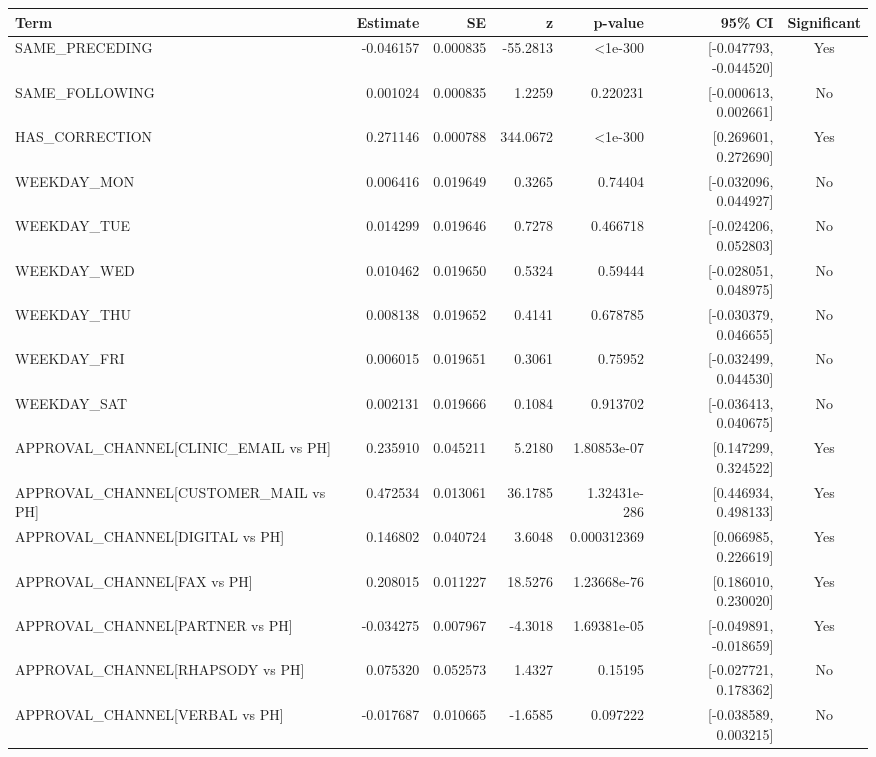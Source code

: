 \documentclass[
]{article}
\newcounter{none} %
\begin{document}
{\def\LTcaptype{none} %
\begin{longtable}[]{@{}lrrrrrc@{}}
\toprule\noalign{}
Term & Estimate & SE & z & p-value & 95\% CI & Significant \\
\midrule\noalign{}
\endhead
\bottomrule\noalign{}
\endlastfoot
SAME\_PRECEDING & -0.046157 & 0.000835 & -55.2813 & \textless1e-300 &
{[}-0.047793, -0.044520{]} & Yes \\
SAME\_FOLLOWING & 0.001024 & 0.000835 & 1.2259 & 0.220231 &
{[}-0.000613, 0.002661{]} & No \\
HAS\_CORRECTION & 0.271146 & 0.000788 & 344.0672 & \textless1e-300 &
{[}0.269601, 0.272690{]} & Yes \\
WEEKDAY\_MON & 0.006416 & 0.019649 & 0.3265 & 0.74404 & {[}-0.032096,
0.044927{]} & No \\
WEEKDAY\_TUE & 0.014299 & 0.019646 & 0.7278 & 0.466718 & {[}-0.024206,
0.052803{]} & No \\
WEEKDAY\_WED & 0.010462 & 0.019650 & 0.5324 & 0.59444 & {[}-0.028051,
0.048975{]} & No \\
WEEKDAY\_THU & 0.008138 & 0.019652 & 0.4141 & 0.678785 & {[}-0.030379,
0.046655{]} & No \\
WEEKDAY\_FRI & 0.006015 & 0.019651 & 0.3061 & 0.75952 & {[}-0.032499,
0.044530{]} & No \\
WEEKDAY\_SAT & 0.002131 & 0.019666 & 0.1084 & 0.913702 & {[}-0.036413,
0.040675{]} & No \\
APPROVAL\_CHANNEL{[}CLINIC\_EMAIL vs PH{]} & 0.235910 & 0.045211 &
5.2180 & 1.80853e-07 & {[}0.147299, 0.324522{]} & Yes \\
APPROVAL\_CHANNEL{[}CUSTOMER\_MAIL vs PH{]} & 0.472534 & 0.013061 &
36.1785 & 1.32431e-286 & {[}0.446934, 0.498133{]} & Yes \\
APPROVAL\_CHANNEL{[}DIGITAL vs PH{]} & 0.146802 & 0.040724 & 3.6048 &
0.000312369 & {[}0.066985, 0.226619{]} & Yes \\
APPROVAL\_CHANNEL{[}FAX vs PH{]} & 0.208015 & 0.011227 & 18.5276 &
1.23668e-76 & {[}0.186010, 0.230020{]} & Yes \\
APPROVAL\_CHANNEL{[}PARTNER vs PH{]} & -0.034275 & 0.007967 & -4.3018 &
1.69381e-05 & {[}-0.049891, -0.018659{]} & Yes \\
APPROVAL\_CHANNEL{[}RHAPSODY vs PH{]} & 0.075320 & 0.052573 & 1.4327 &
0.15195 & {[}-0.027721, 0.178362{]} & No \\
APPROVAL\_CHANNEL{[}VERBAL vs PH{]} & -0.017687 & 0.010665 & -1.6585 &
0.097222 & {[}-0.038589, 0.003215{]} & No \\

\end{longtable}}
\end{document}
